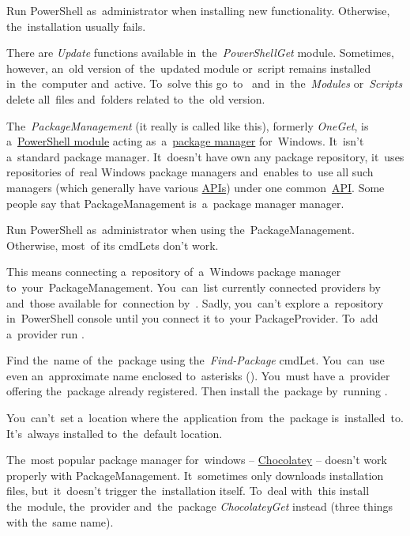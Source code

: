 \warning Run PowerShell as~administrator when installing new functionality.
Otherwise, the~installation usually fails.

There are \textit{Update} functions available in~the~\textit{PowerShellGet} module.
Sometimes, however, an~old version of~the~updated module or~script remains installed in~the~computer and~active.
To~solve this go~to~ and~in~the~\textit{Modules} or~\textit{Scripts} delete all~files and~folders related to~the~old version.

\label{windowspackagemanagement}
The~\textit{PackageManagement} (it really is called like this), formerly \textit{OneGet}, is a~\hyperref[powershellmodule]{PowerShell module} acting as~a~\hyperref[packagemanager]{package manager} for~Windows.
It~isn't a~standard package manager.
It~doesn't have own any package repository, it~uses repositories of~real Windows package managers and~enables to~use all such managers (which generally have various \hyperref[api]{APIs}) under one common~\hyperref[api]{API}.
Some people say that PackageManagement is~a~package manager manager.

\warning Run PowerShell as~administrator when using the~PackageManagement.
Otherwise, most~of its cmdLets don't work.

This means connecting a~repository of~a~Windows package manager to~your~PackageManagement.
You~can~list currently connected providers by~ and~those available for~connection by~.
Sadly, you~can't explore a~repository in~PowerShell console until you connect it to~your PackageProvider.
To~add a~provider run .

Find the~name of~the~package using the~\textit{Find-Package} cmdLet.
You~can~use even an~approximate name enclosed to~asterisks ().
You~must have a~provider offering the~package already registered.
Then install the~package by~running .

\note You~can't~set a~location where the~application from~the~package is~installed~to.
It's~always installed to~the~default location.

\warning The~most popular package manager for~windows -- \href{https://chocolatey.org/}{Chocolatey} --  doesn't work properly with PackageManagement.
It~sometimes only downloads installation files, but~it~doesn't trigger the~installation itself.
To~deal with~this install the~module, the~provider and~the~package \textit{ChocolateyGet} instead (three things with the~same name).
